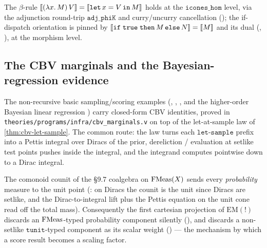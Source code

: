 \begin{lemma}%
\label{lem:cbv-anchor-beta}
\rocqok
{}\rocqok
{}\rocqok
{}
The $\beta$-rule
$[\![ (\lambda x.\,M)\,V ]\!] = [\![ \mathtt{let}\,x = V\,\mathtt{in}\,M ]\!]$
holds at the $\mathtt{icones\_hom}$ level, via the adjunction
round-trip $\mathtt{adj\_phiK}$ and curry/uncurry cancellation
(); the if-dispatch
orientation is pinned by
$[\![ \mathtt{if\;true\;then}\,M\,\mathtt{else}\,N ]\!] = [\![ M ]\!]$ and its
dual (,
), at the morphism
level.
\end{lemma}

\subsection{The CBV marginals and the Bayesian-regression evidence}%
\label{ssec:cbv-marginals}

The non-recursive basic sampling/scoring examples
(,
,
, and the
higher-order Bayesian linear regression
) carry closed-form
CBV identities, proved in
\texttt{theories/programs/infra/cbv\_marginals.v} on top of the
let-at-sample law of \autoref{thm:cbv-let-sample}. The common route:
the law turns each $\mathtt{let}$-$\mathtt{sample}$ prefix into a
Pettis integral over Diracs of the prior, dereliction / evaluation at
setlike test points pushes inside the integral, and the integrand
computes pointwise down to a Dirac integral.

\begin{lemma}%
\label{lem:cbv-marginal-kit}
\rocqok
{}\rocqok
{}\rocqok
{}
The comonoid counit of the \S9.7 coalgebra on $\mathrm{FMeas}(X)$ sends every
\emph{probability} measure to the unit point
(:
on Diracs the counit is the unit since Diracs are setlike, and the
Dirac-to-integral lift plus the Pettis equation on the unit cone read
off the total mass). Consequently the first cartesian projection of
$\mathrm{EM}(\mathord{!})$ discards an $\mathrm{FMeas}$-typed probability
component silently
(),
and discards a non-setlike $\mathtt{tunit}$-typed component as its
scalar weight
()
--- the mechanism by which a score result becomes a scaling factor.
\end{lemma}

